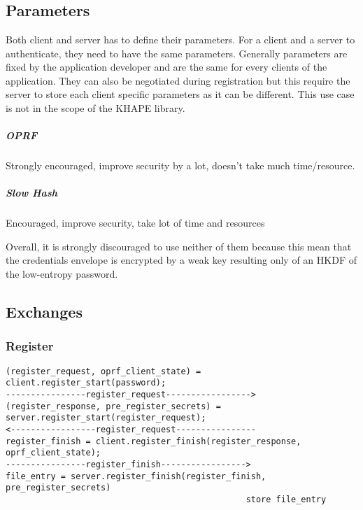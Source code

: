 \documentclass[../report.tex]{subfiles}
\begin{document}
\chapter{}


\section{Parameters}
Both client and server has to define their parameters. For a client and a server to authenticate, they need to have the same parameters. 
Generally parameters are fixed by the application developer and are the same for every clients of the application.
They can also be negotiated during registration but this require the server to store each client specific parameters as it can be different. This use case is not in the scope of the KHAPE library.

\paragraph{OPRF}
Strongly encouraged, improve security by a lot, doesn't take much time/resource.
\paragraph{Slow Hash}
Encouraged, improve security, take lot of time and resources

Overall, it is strongly discouraged to use neither of them because this mean that the credentials envelope is encrypted by a weak key resulting only of an HKDF of the low-entropy password.


\section{Exchanges}

\subsection{Register}
\begin{verbatim}
(register_request, oprf_client_state) = client.register_start(password);
----------------register_request----------------->
(register_response, pre_register_secrets) = server.register_start(register_request);
<-----------------register_request----------------
register_finish = client.register_finish(register_response, oprf_client_state);
----------------register_finish----------------->
file_entry = server.register_finish(register_finish, pre_register_secrets)
                                                store file_entry
\end{verbatim}
\end{document}
